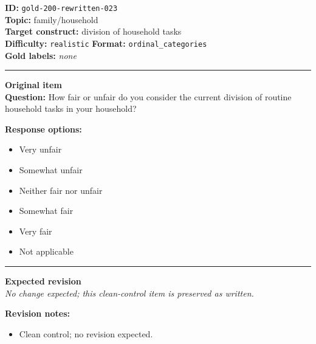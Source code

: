 \documentclass[10pt,a4paper]{article}
\newcommand{\sectionline}{\vspace{0.15em}\hrule\vspace{0.35em}}
\begin{document}
\begin{tcolorbox}[colframe=CleanGreen,colback=white,colbacktitle=CleanGreen!9,coltitle=black,title={Item 023\hfill Clean control}]
\textbf{ID:} \texttt{gold-200-rewritten-023}\\
\textbf{Topic:} family/household\\
\textbf{Target construct:} division of household tasks\\
\textbf{Difficulty:} \texttt{realistic} \quad \textbf{Format:} \texttt{ordinal\_categories}\\
\textbf{Gold labels:} \textit{none}\\
\sectionline
\textbf{Original item}\\
\textbf{Question:} How fair or unfair do you consider the current division of routine household tasks in your household?
\par\textbf{Response options:}
\begin{itemize}
\item Very unfair
\item Somewhat unfair
\item Neither fair nor unfair
\item Somewhat fair
\item Very fair
\item Not applicable
\end{itemize}
\sectionline
\textbf{Expected revision}\\
\textit{No change expected; this clean-control item is preserved as written.}
\par\textbf{Revision notes:}
\begin{itemize}
\item Clean control; no revision expected.
\end{itemize}
\end{tcolorbox}
\end{document}
